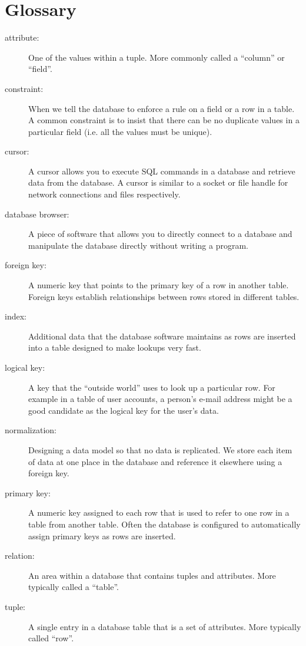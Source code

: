 \documentclass[11pt]{book}
\begin{document}
\section{Glossary}

\begin{description}

\item[attribute:] One of the values within a tuple.  More commonly
called a ``column'' or ``field''.

\item[constraint:] 
When we tell the database to enforce a rule on a field or a row
in a table.  A common constraint is to insist that there can be no
duplicate values in a particular field (i.e. all the values must be unique).

\item[cursor:] A cursor allows you to execute SQL commands in a database
and retrieve data from the database.  A cursor is similar to 
a socket or file handle for network connections and files respectively.

\item[database browser:] 
A piece of software that allows you to directly connect to a database 
and manipulate the database directly without writing a program.

\item[foreign key:] A numeric key that points to the primary key of 
a row in another table.  Foreign keys establish relationships between rows
stored in different tables.

\item[index:] Additional data that the database software maintains as rows
are inserted into a table designed to make lookups very fast.

\item[logical key:] A key that the ``outside world'' uses to look up a particular
row.  For example in a table of user accounts, a person's e-mail address
might be a good candidate as the logical key for the user's data. 

\item[normalization:] Designing a data model so that no data
is replicated.  We store each item of data at one place in the database
and reference it elsewhere using a foreign key.

\item[primary key:] A numeric key assigned to each row that is used to 
refer to one row in a table from another table.  Often the database
is configured to automatically assign primary keys as rows are inserted.

\item[relation:] An area within a database that contains tuples and 
attributes.  More typically called a ``table''.

\item[tuple:] A single entry in a database table that is a set 
of attributes.  More typically called ``row''.

\end{description}
\end{document}
